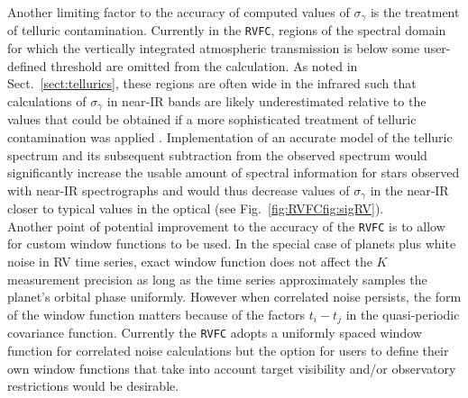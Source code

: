 Another limiting factor to the accuracy of computed values of $\sigma_{\gamma}$
is the treatment of telluric contamination. Currently in the \texttt{RVFC},
regions of the spectral domain for which the vertically integrated atmospheric
transmission is below some user-defined threshold are omitted from the
calculation. As noted in Sect.~\ref{sect:tellurics}, these regions are often
wide in the infrared such that calculations of $\sigma_{\gamma}$ in near-IR
bands are likely underestimated relative to the values that could be obtained
if a more sophisticated treatment of telluric contamination was applied
\citep[e.g.][]{artigau14,bedell19}. Implementation of an accurate model of the
telluric spectrum and its subsequent subtraction from the observed spectrum
would significantly increase the usable amount of spectral information for stars
observed with near-IR spectrographs and would thus decrease values of
$\sigma_{\gamma}$ in the near-IR closer to typical values in the optical (see
Fig.~\ref{fig:RVFCfig:sigRV}). \\

Another point of potential improvement to the accuracy of the \texttt{RVFC} is
to allow for custom window functions to be used. In the special case of planets
plus white noise in RV time series, exact window function does not affect the
$K$ measurement precision \sigK{} as long as the time series approximately
samples the planet's orbital phase uniformly. However when correlated noise
persists, the form of the window function matters because of the factors
$t_i-t_j$ in the quasi-periodic covariance function. Currently the \texttt{RVFC}
adopts a uniformly spaced window function for correlated noise calculations but
the option for users to define their own window functions that take into account
target visibility and/or observatory restrictions would be desirable.


